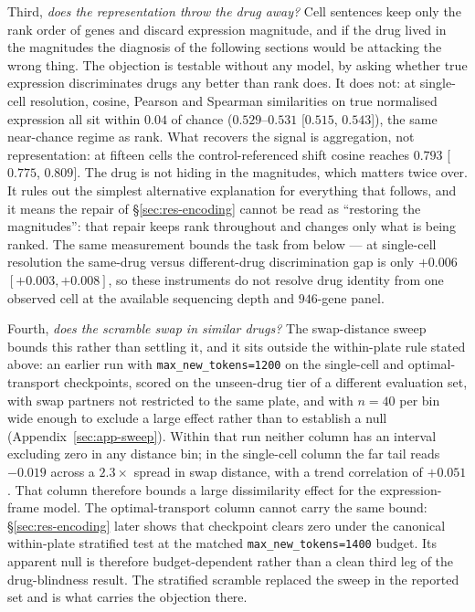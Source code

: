 Third, \emph{does the representation throw the drug away?} Cell sentences keep only the rank order
of genes and discard expression magnitude, and if the drug lived in the magnitudes the diagnosis of
the following sections would be attacking the wrong thing. The objection is testable without any
model, by asking whether true expression discriminates drugs any better than rank does. It does not:
at single-cell resolution, cosine, Pearson and Spearman similarities on true normalised expression
all sit within $0.04$ of chance ($0.529$--$0.531$ [$0.515$, $0.543$]), the same near-chance regime
as rank. What recovers the signal is aggregation, not representation: at fifteen cells the
control-referenced shift cosine reaches $0.793$ [$0.775$, $0.809$]. The drug is not hiding in the
magnitudes, which matters twice over. It rules out the simplest alternative explanation for
everything that follows, and it means the repair of \S\ref{sec:res-encoding} cannot be read as
``restoring the magnitudes'': that repair keeps rank throughout and changes only what is being
ranked. The same measurement bounds the task from below --- at single-cell resolution the same-drug
versus different-drug discrimination gap is only $+0.006$ \nolinebreak[3]$[+0.003, +0.008]$, so
these instruments do not resolve drug identity from one observed cell at the available sequencing
depth and $946$-gene panel.

Fourth, \emph{does the scramble swap in similar drugs?} The swap-distance sweep bounds this rather
than settling it, and it sits outside the within-plate rule stated above: an earlier run with
\texttt{max\_new\_tokens=1200}
on the single-cell and optimal-transport checkpoints, scored on the unseen-drug tier of a different
evaluation set, with swap partners not restricted to the same plate, and with $n=40$ per bin wide
enough to exclude a large effect rather than to establish a null
(Appendix~\ref{sec:app-sweep}). Within that run neither column has an interval excluding zero in any
distance bin; in the single-cell column the far tail reads $-0.019$ across a $2.3\times$ spread in
swap distance, with a trend correlation of $+0.051$. That column therefore bounds a large
dissimilarity effect for the expression-frame model. The optimal-transport column cannot carry the
same bound: \S\ref{sec:res-encoding} later shows that checkpoint clears zero under the canonical
within-plate stratified test at the matched \texttt{max\_new\_tokens=1400} budget. Its apparent
null is therefore budget-dependent rather than a clean third leg of the drug-blindness result. The
stratified scramble replaced the sweep in the
reported set and is what carries the objection there.

